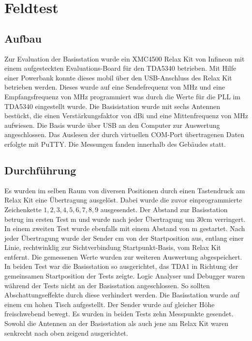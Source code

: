 \chapter{Feldtest}
\label{sec:Feldtest}
\pagestyle{scrheadings}
\section{Aufbau}
Zur Evaluation der Basisstation wurde ein  XMC4500 Relax Kit von Infineon mit einem aufgesteckten Evaluations-Board für den TDA5340 betrieben. Mit Hilfe einer Powerbank konnte dieses mobil über den \ac{USB}-Anschluss des Relax Kit betrieben werden.
Dieses wurde auf eine Sendefrequenz von \unit[868,0]{MHz} und eine Empfangsfrequenz von \unit[867,999]{MHz} programmiert was durch die Werte für die \ac{PLL} im TDA5340 eingestellt wurde. 
Die Basisistation wurde mit sechs Antennen bestückt, die einen Verstärkungsfaktor von \unit[3,6]{dBi} und eine Mittenfrequenz von \unit[868]{MHz} aufwiesen. Die Basis wurde über \ac{USB} an den Computer zur Auswertung angeschlossen. Das Auslesen der durch virtuellen COM-Port übertragenen Daten erfolgte mit  PuTTY. Die Messungen fanden innerhalb des Gebäudes statt.


\section{Durchführung}
Es wurden  im selben Raum von diversen Positionen durch einen Tastendruck am Relax Kit eine Übertragung ausgelöst. Dabei wurde die zuvor einprogrammierte Zeichenkette $1,2,3,4,5,6,7,8,9$ ausgesendet. Der Abstand zur Basisstation betrug im ersten Test  \unit[3,30]{m} und wurde nach jeder Übertragung um $30$cm verringert. 
In einem zweiten Test wurde ebenfalls mit einem Abstand von \unit[3,30]{m} gestartet.  Nach jeder Übertragung wurde der Sender \unit[30]{cm}  von der Startposition aus, entlang einer  Linie, rechtwinklig zur Sichtverbindung Startpunkt-Basis, vom Relax Kit entfernt. Die gemessenen Werte wurden zur weiteren Auswertung abgespeichert.
In beiden Test war die Basisstation so ausgerichtet, das TDA1 in Richtung der gemeinsamen Startposition der Tests zeigte. Logic Analyser und Debugger waren während der Tests nicht an der Basisstation angeschlossen. So sollten Abschattungseffekte durch diese verhindert werden. Die Basisstation wurde auf einem \unit[70]{cm} hohen Tisch aufgestellt. Der Sender wurde auf gleicher Höhe freischwebend bewegt. Es wurden in beiden Tests zehn Messpunkte gesendet. Sowohl die Antennen an der Basisstation als auch jene am Relax Kit waren senkrecht nach oben zeigend ausgerichtet.


